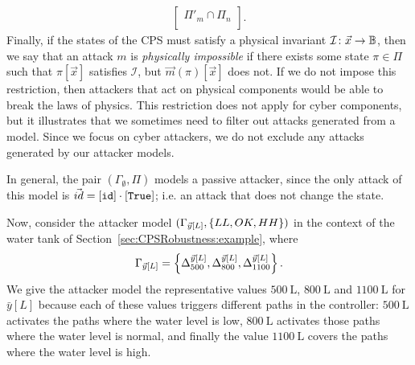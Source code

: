 {\begin{definition}[Attack]
\begin{align}
\begin{bmatrix}
    \Pi'_{m}\cap\Pi_{n}\\
  \end{bmatrix}.
\end{align} 
Finally, if the states of the CPS must satisfy a physical invariant $\mathcal{I}\colon \vec{x}\rightarrow{\mathbb{B}}$, then we say that an attack $m$ is \emph{physically impossible} if there exists some state $\pi\in \Pi$ such that $\pi[\vec{x}]$ satisfies $\mathcal{I}$, but $\vec{m}(\pi)[\vec{x}]$ does not. If we do not impose this restriction, then attackers that act on physical components would be able to break the laws of physics. This restriction does not apply for cyber components, but it illustrates that we sometimes need to filter out attacks generated from a model. %
Since we focus on cyber attackers, we do not exclude any attacks generated by our attacker models. %
\end{definition}
\begin{example}
  \label{ex:CPSRobustness:attack}
  In general, the pair $(\Gamma_{\emptyset}, \Pi)$ models a passive attacker, since the only attack of this model is $\vec{id}=[{\texttt{id}}]\cdot[\texttt{True}]$; i.e. an attack that does not change the state. %

  Now, consider the attacker model $(\Gamma_{\vec{y}[L]},\left\{LL,OK,HH\right\})$ in the context of the water tank of Section~\ref{sec:CPSRobustness:example}, where
  \begin{align}
    \Gamma_{\vec{y}[L]}=\left\{{\Delta}^{\vec{y}[L]}_{500}, {\Delta}^{\vec{y}[L]}_{800},  {\Delta}^{\vec{y}[L]}_{1100}\right\}.
  \end{align}
  We give the attacker model the {representative values} $500~\mathrm{L}$, $800~\mathrm{L}$ and $1100~\mathrm{L}$ for $\bar{y}[L]$ because each of these values triggers different paths in the controller: $500~\mathrm{L}$ activates the paths where the water level is low, $800~\mathrm{L}$ activates those paths where the water level is normal, and finally the value $1100~\mathrm{L}$ covers the paths where the water level is high.


\end{example}}
